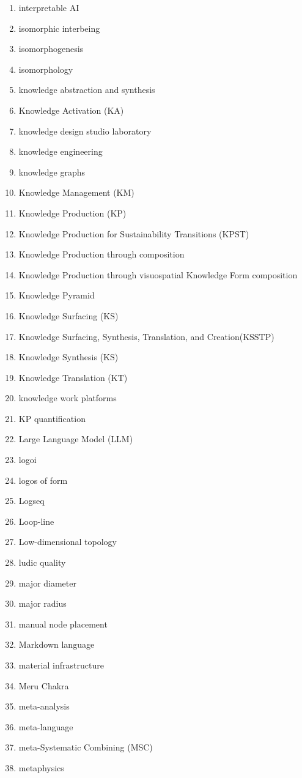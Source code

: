 \begin{multicols}{4}
\begin{enumerate}[label=\arabic*.]
\item interpretable AI
\item isomorphic interbeing
\item isomorphogenesis
\item isomorphology
\item knowledge abstraction and synthesis
\item Knowledge Activation (KA)
\item knowledge design studio laboratory
\item knowledge engineering
\item knowledge graphs
\item Knowledge Management (KM)
\item Knowledge Production (KP)
\item Knowledge Production for Sustainability Transitions (KPST)
\item Knowledge Production through composition
\item Knowledge Production through visuospatial Knowledge Form composition
\item Knowledge Pyramid
\item Knowledge Surfacing (KS)
\item Knowledge Surfacing, Synthesis, Translation, and Creation(KSSTP)
\item Knowledge Synthesis (KS)
\item Knowledge Translation (KT)
\item knowledge work platforms
\item KP quantification
\item Large Language Model (LLM)
\item logoi
\item logos of form
\item Logseq
\item Loop-line
\item Low-dimensional topology
\item ludic quality
\item major diameter
\item major radius
\item manual node placement
\item Markdown language
\item material infrastructure
\item Meru Chakra
\item meta-analysis
\item meta-language
\item meta-Systematic Combining (MSC)
\item metaphysics

\end{enumerate}
\end{multicols}
